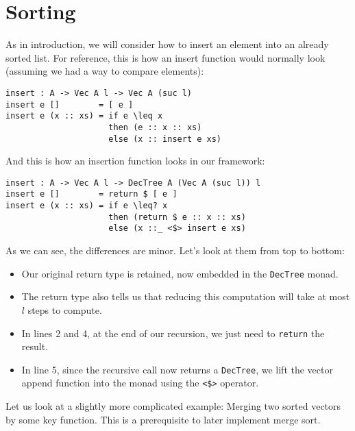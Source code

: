 
\section{Sorting}

As in introduction, we will consider how to insert an element into an already sorted list. For reference, this is how an insert function would normally look (assuming we had a way to compare elements):

\begin{lstlisting}[caption={Plain Insertion},label={lst:insert:plain},emph={insert, if, then, else}]
insert : A -> Vec A l -> Vec A (suc l)
insert e []        = [ e ]
insert e (x :: xs) = if e \leq x
                     then (e :: x :: xs)
                     else (x :: insert e xs)
\end{lstlisting}

And this is how an insertion function looks in our framework:

\begin{lstlisting}[caption={Insertion With Runtime Bound},label={lst:insert:bounded},emph={insert,if,then,else,return}]
insert : A -> Vec A l -> DecTree A (Vec A (suc l)) l
insert e []        = return $ [ e ]
insert e (x :: xs) = if e \leq? x
                     then (return $ e :: x :: xs)
                     else (x ::_ <$> insert e xs)
\end{lstlisting}

As we can see, the differences are minor. Let's look at them from top to bottom:

\begin{itemize}
    \item Our original return type is retained, now embedded in the \texttt{DecTree} monad.
    \item The return type also tells us that reducing this computation will take at most $l$ steps to compute.
    \item In lines 2 and 4, at the end of our recursion, we just need to \texttt{return} the result.
    \item In line 5, since the recursive call now returns a \texttt{DecTree}, we lift the vector append function into the monad using the \texttt{<\$>} operator.
\end{itemize}

Let us look at a slightly more complicated example: Merging two sorted vectors by some key function. This is a prerequisite to later implement merge sort.

